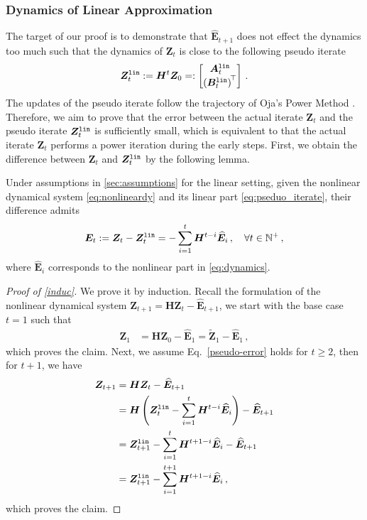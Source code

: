 \subsubsection{Dynamics of Linear Approximation}
The target of our proof is to demonstrate that $\widehat{\bm E}_{t+1}$ does not effect the dynamics too much such that the dynamics of $\bm Z_{t}$ is close to the following pseudo iterate
\begin{align}\label{eq:pseduo_iterate}
    \bm Z^{\tt lin}_t := \bm H^t \bm Z_0 =: \begin{bmatrix}
    \bm A^{\tt lin}_t \\ \left(\bm B^{\tt lin}_t\right)^{\!\top}
\end{bmatrix} \,.
\end{align}
The updates of the pseudo iterate follow the trajectory of Oja's Power Method \citep{oja1982simplified}. Therefore, we aim to prove that the error between the actual iterate $\bm Z_t$ and the pseudo iterate $\bm Z^{\tt lin}_t$ is sufficiently small, which is equivalent to that the actual iterate $\bm Z_t$ performs a power iteration during the early steps. First, 
we obtain the difference between $\bm Z_t$ and $\bm Z^{\tt lin}_t$ by the following lemma.
\begin{lemma}[Formulation of $\bm E_t$]
\label{induc}
Under assumptions in \cref{sec:assumptions} for the linear setting, given the nonlinear dynamical system \eqref{eq:nonlineardy} and its linear part \eqref{eq:pseduo_iterate}, their difference admits
    \begin{align}
      \bm E_t := \bm Z_t - \bm Z^{\tt lin}_t = - \sum_{i=1}^t \bm H^{t-i} \widehat{\bm E}_{i}\label{pseudo-error} \,, \quad \forall t \in \mathbb{N}^+\,,
    \end{align}
where $\widehat{\bm E}_{i}$ corresponds to the nonlinear part in \cref{eq:dynamics}.
\end{lemma}

\begin{proof}[Proof of \cref{induc}]
We prove it by induction.
Recall the formulation of the nonlinear dynamical system
$\bm Z_{t+1} = \bm H \bm Z_t - \widehat{\bm E}_{t+1}$, we start with the base case $t=1$ such that
    \begin{align*}
        \bm Z_1 & = \bm H \bm Z_0 - \widehat{\bm E}_{1} = \widetilde{\bm Z}_1 - \widehat{\bm E}_{1}\, ,
    \end{align*}
    which proves the claim. Next, we assume Eq.~\eqref{pseudo-error} holds for $t\geq 2$, then for $t+1$, we have
    \begin{align*}
        \bm Z_{t+1} & = \bm H \bm Z_t - \widehat{\bm E}_{t+1}\\
        & = \bm H \left(\bm Z^{\tt lin}_t - \sum_{i=1}^t \bm H^{t-i} \widehat{\bm E}_{i}\right)- \widehat{\bm E}_{t+1}\\
        & = \bm Z^{\tt lin}_{t+1} - \sum_{i=1}^{t} \bm H^{t+1-i} \widehat{\bm E}_{i} - \widehat{\bm E}_{t+1}\\
        & = \bm Z^{\tt lin}_{t+1} - \sum_{i=1}^{t+1} \bm H^{t+1-i} \widehat{\bm E}_{i}\, ,
    \end{align*}
    which proves the claim.
\end{proof}

